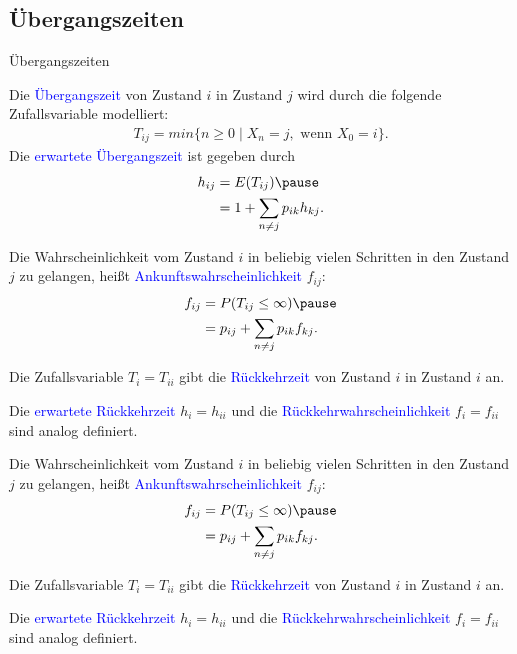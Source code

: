 \documentclass{beamer}
\def\spadding{\vspace{0.25cm}}
\def\b{\textcolor{blue}}
\begin{document}
\subsection{Übergangszeiten}
\begin{frame}{Übergangszeiten}
    \begin{definition}
        Die \b{Übergangszeit} von Zustand $i$ in Zustand $j$ wird durch die folgende Zufallsvariable modelliert:
        \begin{align*}
            T_{ij} = min \{n \geq 0 \mid X_n = j, \text{ wenn } X_0 = i\}.
        \end{align*}\pause
        Die \b{erwartete Übergangszeit} ist gegeben durch
        \begin{align*}
            h_{ij} &= E(T_{ij})\pause \\
                   &= 1 + \sum_{n \neq j} p_{ik} h_{kj}.
        \end{align*}
    \end{definition}
\end{frame}

\begin{frame}
    Die Wahrscheinlichkeit vom Zustand $i$ in beliebig vielen Schritten in den Zustand $j$ zu gelangen, heißt \b{Ankunftswahrscheinlichkeit} $f_{ij}$:
    \begin{align*}
        f_{ij} &= P(T_{ij} \leq \infty)\pause \\
               &= p_{ij} + \sum_{n \neq j} p_{ik} f_{kj}.
    \end{align*}\pause
    \begin{definition}
        Die Zufallsvariable $T_i = T_{ii}$ gibt die \b{Rückkehrzeit} von Zustand $i$ in Zustand $i$ an.\pause\par\spadding
        Die \b{erwartete Rückkehrzeit} $h_i = h_{ii}$ und die \b{Rückkehrwahrscheinlichkeit} $f_i = f_{ii}$ sind analog definiert.
    \end{definition}
\end{frame}

\begin{frame}
    Die Wahrscheinlichkeit vom Zustand $i$ in beliebig vielen Schritten in den Zustand $j$ zu gelangen, heißt \b{Ankunftswahrscheinlichkeit} $f_{ij}$:
    \begin{align*}
        f_{ij} &= P(T_{ij} \leq \infty)\pause \\
               &= p_{ij} + \sum_{n \neq j} p_{ik} f_{kj}.
    \end{align*}\pause
    \begin{definition}
        Die Zufallsvariable $T_i = T_{ii}$ gibt die \b{Rückkehrzeit} von Zustand $i$ in Zustand $i$ an.\pause\par\spadding
        Die \b{erwartete Rückkehrzeit} $h_i = h_{ii}$ und die \b{Rückkehrwahrscheinlichkeit} $f_i = f_{ii}$ sind analog definiert.
    \end{definition}
\end{frame}
\end{document}
